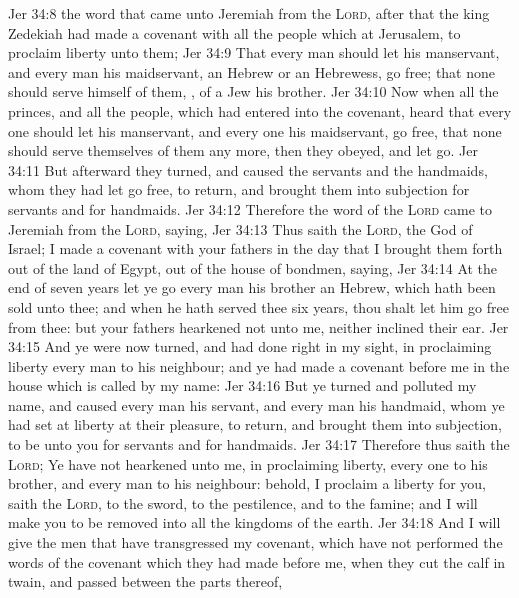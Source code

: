\vs Jer 34:8  the word that came unto Jeremiah from the \textsc{Lord}, after that the king Zedekiah had made a covenant with all the people which  at Jerusalem, to proclaim liberty unto them;
\vs Jer 34:9 That every man should let his manservant, and every man his maidservant,  an Hebrew or an Hebrewess, go free; that none should serve himself of them, , of a Jew his brother.
\vs Jer 34:10 Now when all the princes, and all the people, which had entered into the covenant, heard that every one should let his manservant, and every one his maidservant, go free, that none should serve themselves of them any more, then they obeyed, and let  go.
\vs Jer 34:11 But afterward they turned, and caused the servants and the handmaids, whom they had let go free, to return, and brought them into subjection for servants and for handmaids.
\vs Jer 34:12 Therefore the word of the \textsc{Lord} came to Jeremiah from the \textsc{Lord}, saying,
\vs Jer 34:13 Thus saith the \textsc{Lord}, the God of Israel; I made a covenant with your fathers in the day that I brought them forth out of the land of Egypt, out of the house of bondmen, saying,
\vs Jer 34:14 At the end of seven years let ye go every man his brother an Hebrew, which hath been sold unto thee; and when he hath served thee six years, thou shalt let him go free from thee: but your fathers hearkened not unto me, neither inclined their ear.
\vs Jer 34:15 And ye were now turned, and had done right in my sight, in proclaiming liberty every man to his neighbour; and ye had made a covenant before me in the house which is called by my name:
\vs Jer 34:16 But ye turned and polluted my name, and caused every man his servant, and every man his handmaid, whom ye had set at liberty at their pleasure, to return, and brought them into subjection, to be unto you for servants and for handmaids.
\vs Jer 34:17 Therefore thus saith the \textsc{Lord}; Ye have not hearkened unto me, in proclaiming liberty, every one to his brother, and every man to his neighbour: behold, I proclaim a liberty for you, saith the \textsc{Lord}, to the sword, to the pestilence, and to the famine; and I will make you to be removed into all the kingdoms of the earth.
\vs Jer 34:18 And I will give the men that have transgressed my covenant, which have not performed the words of the covenant which they had made before me, when they cut the calf in twain, and passed between the parts thereof,

